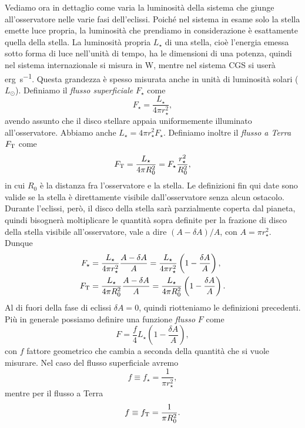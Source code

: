 Vediamo ora in dettaglio come varia la luminosità della sistema che giunge
all'osservatore nelle varie fasi dell'eclissi. Poiché nel sistema in esame solo
la stella emette luce propria, la luminosità che prendiamo in considerazione è
esattamente quella della stella. La luminosità propria $L_\star$ di una stella,
cioè l'energia emessa sotto forma di luce nell'unità di tempo, ha le dimensioni
di una potenza, quindi nel sistema internazionale si misura in \si{\watt},
mentre nel sistema CGS si userà \si{erg\per \second}. Questa grandezza è spesso
misurata anche in unità di luminosità solari ($L_\odot$). Definiamo il
\emph{flusso superficiale} $F_\star$ come
\begin{equation}
    F_\star = \frac{L_\star}{4\pi r_\star^2},
\end{equation}
avendo assunto che il disco stellare appaia uniformemente illuminato
all'osservatore. Abbiamo anche $L_\star = 4\pi r_\star^2 F_\star$. Definiamo
inoltre il \emph{flusso a Terra} $F_{\textup{T}}$ come
\begin{equation}
  F_{\textup{T}} = \frac{L_\star}{4\pi R_0^2} = F_\star \frac{r_\star^2}{R_0^2},
\end{equation}
in cui $R_0$ è la distanza fra l'osservatore e la stella. Le definizioni fin qui
date sono valide se la stella è direttamente visibile dall'osservatore senza
alcun ostacolo. Durante l'eclissi, però, il disco della stella sarà parzialmente
coperta dal pianeta, quindi bisognerà moltiplicare le quantità sopra definite
per la frazione di disco della stella visibile all'osservatore, vale a dire
$(A - \delta A)/A$, con $A= \pi r_\star^2$. Dunque
\begin{align}
  F_\star &= \frac{L_\star}{4\pi r_\star^2} \frac{A - \delta A}{A} =
  \frac{L_\star}{4\pi r_\star^2} \left( 1 - \frac{\delta A}{A} \right), \\
  F_{\textup{T}} &= \frac{L_\star}{4\pi R_0^2} \frac{A - \delta A}{A} =
  \frac{L_\star}{4\pi R_0^2} \left( 1 - \frac{\delta A}{A} \right).
\end{align}
Al di fuori della fase di eclissi $\delta A = 0$, quindi riotteniamo le
definizioni precedenti. Più in generale possiamo definire una funzione
\emph{flusso} $F$ come
\begin{equation}
  F = \frac{f}{4} L_\star \left( 1 - \frac{\delta A}{A} \right),
\end{equation}
con $f$ fattore geometrico che cambia a seconda della quantità che si vuole
misurare. Nel caso del flusso superficiale avremo
\begin{equation}
  f \equiv f_\star = \frac{1}{\pi r_\star^2},
\end{equation}
mentre per il flusso a Terra
\begin{equation}
  f \equiv f_{\textup{T}} = \frac{1}{\pi R_0^2}.
\end{equation}

